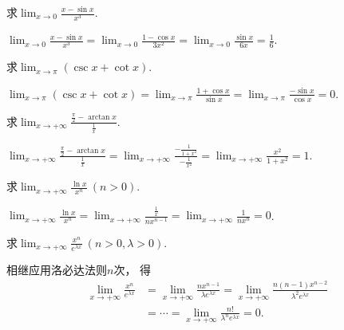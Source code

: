 \begin{example}
求\(\lim_{x\to0} \frac{x-\sin x}{x^3}\).
\begin{solution}
\(\lim_{x\to0} \frac{x-\sin x}{x^3}
= \lim_{x\to0} \frac{1-\cos x}{3x^2}
= \lim_{x\to0} \frac{\sin x}{6x}
= \frac16\).
\end{solution}
\end{example}

\begin{example}
求\(\lim_{x\to\pi} (\csc x+\cot x)\).
\begin{solution}
\(\lim_{x\to\pi} (\csc x+\cot x)
= \lim_{x\to\pi} \frac{1+\cos x}{\sin x}
= \lim_{x\to\pi} \frac{-\sin x}{\cos x}
= 0\).
\end{solution}
\end{example}

\begin{example}
求\(\lim_{x\to+\infty} \frac{\frac{\pi}{2} - \arctan x}{\frac{1}{x}}\).
\begin{solution}
\(\lim_{x\to+\infty} \frac{\frac{\pi}{2} - \arctan x}{\frac{1}{x}}
= \lim_{x\to+\infty} \frac{-\frac{1}{1+x^2}}{-\frac{1}{x^2}}
= \lim_{x\to+\infty} \frac{x^2}{1+x^2} = 1\).
\end{solution}
\end{example}

\begin{example}\label{example:微分中值定理.洛必达法则.无穷大比无穷大型1}
求\(\lim_{x\to+\infty} \frac{\ln x}{x^n}\ (n>0)\).
\begin{solution}
\(\lim_{x\to+\infty} \frac{\ln x}{x^n}
= \lim_{x\to+\infty} \frac{\frac{1}{x}}{n x^{n-1}} %
= \lim_{x\to+\infty} \frac{1}{n x^n} = 0\).
\end{solution}
\end{example}

\begin{example}\label{example:微分中值定理.洛必达法则.无穷大比无穷大型2}
求\(\lim_{x\to+\infty} \frac{x^n}{e^{\lambda x}}\ (n>0,\lambda>0)\).
\begin{solution}
相继应用洛必达法则\(n\)次，
得\begin{align*}
	\lim_{x\to+\infty} \frac{x^n}{e^{\lambda x}}
	&= \lim_{x\to+\infty} \frac{n x^{n-1}}{\lambda e^{\lambda x}} %
	= \lim_{x\to+\infty} \frac{n(n-1) x^{n-2}}{\lambda^2 e^{\lambda x}} \\
	&= \dotsb = \lim_{x\to+\infty} \frac{n!}{\lambda^n e^{\lambda x}}
	= 0.
\end{align*}
\end{solution}
\end{example}

